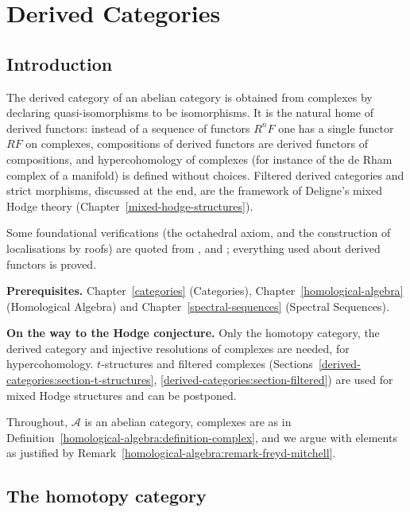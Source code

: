 \chapter{Derived Categories}\label{derived-categories}

\section{Introduction}\label{derived-categories:section-introduction}

The derived category of an abelian category is obtained from complexes by declaring quasi-isomorphisms to be
isomorphisms. It is the natural home of derived functors: instead of a sequence of functors $R^nF$ one has a
single functor $RF$ on complexes, compositions of derived functors are derived functors of compositions, and
hypercohomology of complexes (for instance of the de Rham complex of a manifold) is defined without choices.
Filtered derived categories and strict morphisms, discussed at the end, are the framework of Deligne's mixed Hodge
theory (Chapter~\ref{mixed-hodge-structures}).

Some foundational verifications (the octahedral axiom, and the construction of localisations by roofs) are quoted
from \cite[Chapter 10]{weibel-homological}, \cite[Chapter III]{gelfand-manin} and \cite{kashiwara-schapira}; everything
used about derived functors is proved.

\noindent\textbf{Prerequisites.} Chapter~\ref{categories} (Categories), Chapter~\ref{homological-algebra} (Homological
Algebra) and Chapter~\ref{spectral-sequences} (Spectral Sequences).

\noindent\textbf{On the way to the Hodge conjecture.} Only the homotopy category, the derived category and injective resolutions of complexes are needed, for hypercohomology. $t$-structures and
filtered complexes (Sections~\ref{derived-categories:section-t-structures}, \ref{derived-categories:section-filtered}) are used for mixed Hodge structures and can be postponed.

Throughout, $\mathcal{A}$ is an abelian category, complexes are as in
Definition~\ref{homological-algebra:definition-complex}, and we argue with elements as justified by
Remark~\ref{homological-algebra:remark-freyd-mitchell}.

\section{The homotopy category}\label{derived-categories:section-homotopy-category}

